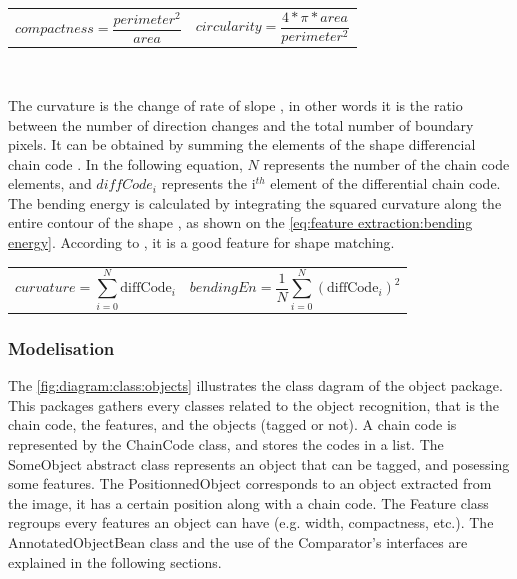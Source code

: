 \noindent\begin{tabularx}{\textwidth}{@{}XX@{}}
	\begin{equation} \label{eq:feature extraction:compactness}
		compactness = \frac{perimeter^2}{area}
	\end{equation} & 
	\begin{equation} \label{eq:feature extraction:circularity}
		circularity = \frac{4 * \pi * area}{perimeter^2}
	\end{equation}
\end{tabularx}

~~ 

The curvature is the change of rate of slope \cite{bib:chain:ObjectDescription}, in other words it is the ratio between the number of direction changes and the total number of boundary pixels. It can be obtained by summing the elements of the shape differencial chain code  \cite{bib:chain:ShapeRepresentationDescription}. In the following equation, $N$ represents the number of the chain code elements, and $diffCode_i$ represents the i$^{th}$ element of the differential chain code. The bending energy is calculated by integrating the squared curvature along the entire contour of the shape \cite{bib:chain:ShapeRepresentationDescription}, as shown on the \vref{eq:feature extraction:bending energy}. According to \cite{bib:chain:ShapeDescriptionLesson}, it is a good feature for shape matching. 

\noindent\begin{tabularx}{\textwidth}{@{}XX@{}}
	\begin{equation}
		curvature = \sum_{i = 0}^{N} \text{diffCode}_i
	\end{equation} & 
	\begin{equation} \label{eq:feature extraction:bending energy}
		bendingEn = \frac{1}{N} \sum_{i = 0}^{N} (\text{diffCode}_i)^{2}
	\end{equation}
\end{tabularx}







\subsubsection{Modelisation}


The \vref{fig:diagram:class:objects} illustrates the class dagram of the object package. This packages gathers every classes related to the object recognition, that is the chain code, the features, and the objects (tagged or not). A chain code is represented by the ChainCode class, and stores the codes in a list. The SomeObject abstract class represents an object that can be tagged, and posessing some features. The PositionnedObject corresponds to an object extracted from the image, it has a certain position along with a chain code. The Feature class regroups every features an object can have (e.g. width, compactness, etc.). The AnnotatedObjectBean class and the use of the Comparator's interfaces are explained in the following sections. 


